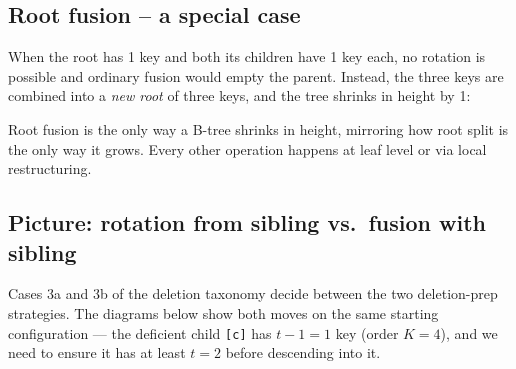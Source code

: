 \documentclass[11pt]{article}
\begin{document}
\subsection*{Root fusion -- a special case}

When the root has 1 key and both its children have 1 key each, no rotation is possible and ordinary fusion would empty the parent. Instead, the three keys are combined into a \emph{new root} of three keys, and the tree shrinks in height by 1:

\begin{ideabox}
Root fusion is the only way a B-tree shrinks in height, mirroring how root split is the only way it grows. Every other operation happens at leaf level or via local restructuring.
\end{ideabox}

\subsection*{Picture: rotation from sibling vs.\ fusion with sibling}

Cases 3a and 3b of the deletion taxonomy decide between the two
deletion-prep strategies. The diagrams below show both moves on the
same starting configuration --- the deficient child \texttt{[c]} has
$t-1 = 1$ key (order $K=4$), and we need to ensure it has at least
$t = 2$ before descending into it.
\end{document}
